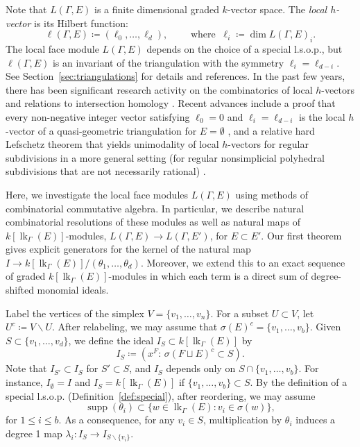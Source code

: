 \documentclass[ALCO, Unicode,published]{cedram}
\DeclareMathOperator{\lk}{lk}
\DeclareMathOperator{\supp}{supp}
\begin{document}
Note that $L(\Gamma,E)$ is a finite dimensional graded $k$-vector space. The \emph{local $h$-vector} is its Hilbert function: 
\[
\ell(\Gamma, E)  \coloneqq  (\ell_0, \ldots, \ell_{d}), \quad \quad \mbox{ where } \ \ell_i  \coloneqq  \dim L(\Gamma,E)_i.
\]
The local face module $L(\Gamma,E)$ depends on the choice of a special l.s.o.p., but $\ell(\Gamma,E)$ is an invariant of the triangulation with the symmetry $\ell_i = \ell_{d- i}$. See Section~\ref{sec:triangulations} for details and references. In the past few years, there has been significant research activity on the combinatorics of local $h$-vectors and relations to intersection homology \cite{Athanasiadis16, KatzStapledon16, Stapledon17, deCataldoMiglioriniMustata18}.  Recent advances include a proof that every non-negative integer vector satisfying $\ell_0 = 0$ and $\ell_i = \ell_{d-i}$ is the local $h$-vector of a quasi-geometric triangulation for $E = \emptyset$ \cite{JKMS}, and a relative hard Lefschetz theorem that yields unimodality of local $h$-vectors for regular subdivisions in a more general setting (for regular nonsimplicial polyhedral subdivisions that are not necessarily rational) \cite{Karu19}.

 

Here, we investigate the local face modules $L(\Gamma, E)$ using methods of combinatorial commutative algebra. In particular, we describe natural combinatorial resolutions of these modules as well as natural maps of $k[\lk_\Gamma(E)]$-modules, $L(\Gamma,E) \to L(\Gamma, E')$, for $E \subset E'$.  Our first theorem gives explicit generators for the kernel of the natural map $I \to k[\lk_\Gamma(E)]/(\theta_1, \ldots, \theta_d)$. Moreover, we extend this to an exact sequence of graded $k[\lk_\Gamma(E)]$-modules in which each term is a direct sum of degree-shifted monomial ideals.

Label the vertices of the simplex $V = \{ v_1, \ldots, v_n \}$.  For a subset $U \subset V$, let $U^c  \coloneqq  V \smallsetminus U$. After relabeling, we may assume that $\sigma(E)^c = \{v_1, \ldots, v_b\}$. Given $S \subset \{v_1, \ldots, v_d\}$, 
we define the ideal $I_S \subset k[\lk_\Gamma(E)]$ by
\begin{equation*}
I_S  \coloneqq  ( x^F : \, \sigma(F \sqcup E)^c \subset S). 
\end{equation*}
Note that $I_{S'} \subset I_{S}$ for $S' \subset S$, and $I_S$ depends only on $S \cap \{v_1, \ldots, v_b\}$. For instance, $I_{\emptyset} = I$ and $I_{S} = k[\lk_{\Gamma}(E)]$ if $\{v_1, \ldots, v_b \} \subset S$. By the definition of a special l.s.o.p. (Definition~\ref{def:special}), after reordering, we may assume
\[
\supp(\theta_i) \subset \{ w \in \lk_\Gamma(E) : v_i \in \sigma(w) \}, 
\]
for $1 \leq i \leq b$.  As a consequence, for any $v_i \in S$, multiplication by $\theta_i$ induces a degree 1 map $\lambda_i \colon I_S \to I_{S \smallsetminus \{v_i\}}$.
\end{document}

